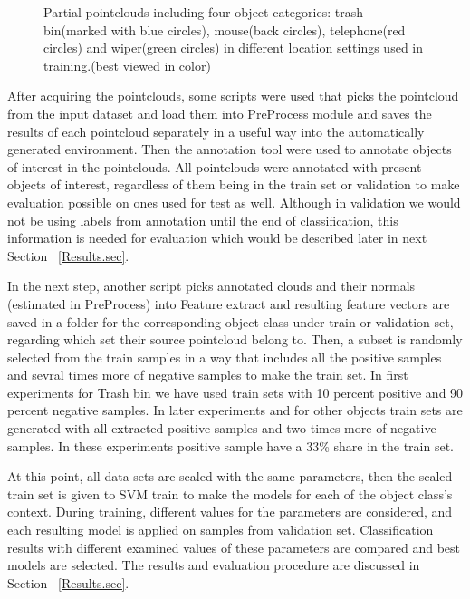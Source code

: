 \begin{figure} [htp]
\begin{center}
  \end{center}
  \caption[Train set pointclouds including four different object class.]
  {Partial pointclouds including four object categories: trash bin(marked with blue circles), mouse(back circles), telephone(red circles) and wiper(green circles) in different location settings used in training.(best viewed in color)}
  \label{TrainClouds2.figure:edge}
\end{figure}




After acquiring the pointclouds, some scripts were used that picks the pointcloud from the input dataset 
and load them into PreProcess module and saves the results of each pointcloud separately in a useful way into the automatically
generated environment. 
Then the annotation tool were used to annotate objects of interest in the pointclouds. 
All pointclouds were annotated with present objects of interest, regardless of them being in the train set or validation to 
make evaluation possible on ones used for test as well. 
Although in validation we would not be using labels from annotation until the end of classification, 
this information is needed for evaluation which would be described later in next Section ~\ref{Results.sec}.


In the next step, another script picks annotated clouds and their normals (estimated in PreProcess) into Feature extract 
and  resulting feature vectors are saved in a folder for the corresponding object class under train or validation set, regarding
which set their source pointcloud belong to.
Then, a subset is randomly selected from the train samples in a way that includes all the positive samples and sevral times more of 
 negative samples to make the train set.
In first experiments for Trash bin we have used train sets with 10 percent positive and 90 percent negative samples.
In later experiments and for other objects train sets are generated with all extracted positive samples and two times more of negative samples.
In these experiments positive sample have a 33\% share in the train set.

At this point, all data sets are scaled with the same parameters, then the scaled train set is given to SVM train 
to make the models for each of the object class's context. 
During training, different values for the parameters are considered, and each resulting model is applied on samples from validation
set. 
Classification results with different examined values of these parameters are compared and best models are selected. 
The results and evaluation procedure are discussed in Section ~\ref{Results.sec}.

